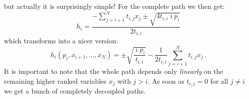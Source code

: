 \documentclass[a4paper,10pt]{article}
\begin{document}
but actually it is surprisingly simple!
For the complete path we then get:
\begin{equation}
  h_i = \frac{-\sum_{j=i+1}^{N} t_{i,j} x_j \pm \sqrt{4 t_{i,i} \imath p_i}}
             {2 t_{i,i}}
\end{equation}
which transforms into a nicer version:
\begin{equation} \label{eq:general_path_formula}
\boxed{
  h_i\left(p_i, x_{i+1}, \ldots, x_N\right)
  =
  \pm \sqrt{\frac{\imath p_i}{t_{i,i}}}
  -\frac{1}{2 t_{i,i}} \sum_{j=i+1}^{N} t_{i,j} x_j
  \,.
}
\end{equation}
It is important to note that the whole path depends only \emph{linearly}
on the remaining higher ranked variables $x_j$ with $j>i$.
As soon as $t_{i,j} = 0$ for all $j \neq i$ we get a bunch of
completely decoupled paths.
\end{document}
